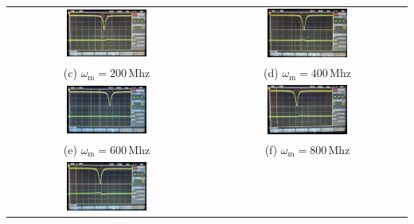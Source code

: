 \begin{center}
    \captionsetup{type=figure}
    \begin{tabular}{c c}
        \includegraphics[width=0.42\textwidth]{Bilder/Modulationsindex/mindex_200.jpg} 
        & \includegraphics[width=0.42\textwidth]{Bilder/Modulationsindex/mindex_400.jpg}  \\
        (c) $\omega_\mathrm{m} = 200$\,Mhz & (d) $\omega_\mathrm{m} = 400$\,Mhz \\[0,3cm]
        \includegraphics[width=0.42\textwidth]{Bilder/Modulationsindex/mindex_600.jpg} 
        & \includegraphics[width=0.42\textwidth]{Bilder/Modulationsindex/mindex_800.jpg} \\
        (e) $\omega_\mathrm{m} = 600$\,Mhz & (f) $\omega_\mathrm{m} = 800$\,Mhz \\[0,3cm]
        \includegraphics[width=0.42\textwidth]{Bilder/Modulationsindex/mindex_1000.jpg}

\end{tabular}
\end{center}
